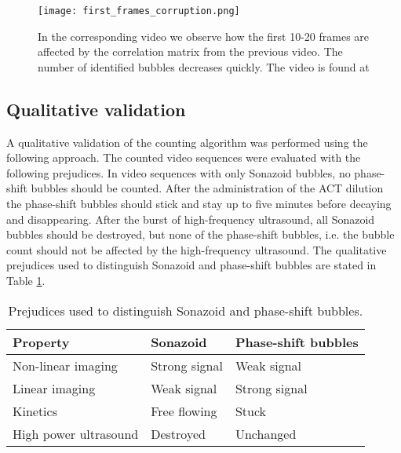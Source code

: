 \begin{figure}[h]
	\centering
	\texttt{[image: first\_frames\_corruption.png]}
	\cprotect\caption{In the corresponding video we observe how the first 10-20 frames are affected by the correlation matrix from the previous video. The number of identified bubbles decreases quickly. The video is found at }
	\label{Fig:first_frames}
\end{figure}

\subsection{Qualitative validation}
\label{sec:qualitative}
A qualitative validation of the counting algorithm was performed using the following approach. The counted video sequences were evaluated with the following prejudices. In video sequences with only Sonazoid\texttrademark{} bubbles, no phase-shift bubbles should be counted. After the administration of the ACT\texttrademark{} dilution the phase-shift bubbles should stick and stay up to five minutes before decaying and disappearing. After the burst of high-frequency ultrasound, all Sonazoid\texttrademark{} bubbles should be destroyed, but none of the phase-shift bubbles, i.e. the bubble count should not be affected by the high-frequency ultrasound. The qualitative prejudices used to distinguish Sonazoid\texttrademark{} and phase-shift bubbles are stated in Table \ref{tab:qualitative}.


\begin{table}[H]
\caption{Prejudices used to distinguish Sonazoid\texttrademark{} and phase-shift bubbles.}
\label{tab:qualitative}
\begin{center}
\begin{tabular}{@{}l l l @{}}
  \toprule
  Property & Sonazoid\texttrademark{} & Phase-shift bubbles \\
  \midrule
  Non-linear imaging & Strong signal & Weak signal \\
  Linear imaging & Weak signal & Strong signal \\
  Kinetics & Free flowing & Stuck \\
  High power ultrasound & Destroyed &Unchanged\\
  \bottomrule
\end{tabular}
\end{center}
\end{table}


